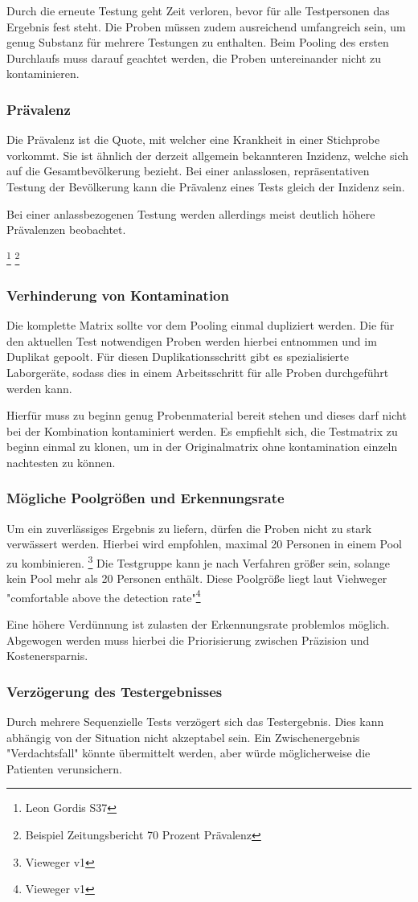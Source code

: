 Durch die erneute Testung geht Zeit verloren, bevor für alle Testpersonen das Ergebnis fest steht.
Die Proben müssen zudem ausreichend umfangreich sein, um genug Substanz für mehrere Testungen zu enthalten.
Beim Pooling des ersten Durchlaufs muss darauf geachtet werden, die Proben untereinander nicht zu kontaminieren.

\subsubsection{Prävalenz}
Die Prävalenz ist die Quote, mit welcher eine Krankheit in einer Stichprobe vorkommt.
Sie ist ähnlich der derzeit allgemein bekannteren Inzidenz, welche sich auf die Gesamtbevölkerung bezieht.
Bei einer anlasslosen, repräsentativen Testung der Bevölkerung kann die Prävalenz eines Tests gleich der Inzidenz sein.

Bei einer anlassbezogenen Testung werden allerdings meist deutlich höhere Prävalenzen beobachtet.

\footnote{Leon Gordis S37}
\footnote{Beispiel Zeitungsbericht 70 Prozent Prävalenz}


\subsubsection{Verhinderung von Kontamination}
Die komplette Matrix sollte vor dem Pooling einmal dupliziert werden. 
Die für den aktuellen Test notwendigen Proben werden hierbei entnommen und im Duplikat gepoolt.
Für diesen Duplikationsschritt gibt es spezialisierte Laborgeräte, sodass dies in einem Arbeitsschritt für alle Proben durchgeführt werden kann.

Hierfür muss zu beginn genug Probenmaterial bereit stehen und dieses darf nicht bei der Kombination kontaminiert werden.
Es empfiehlt sich, die Testmatrix zu beginn einmal zu klonen, um in der Originalmatrix ohne kontamination einzeln nachtesten zu können.

\subsubsection{Mögliche Poolgrößen und Erkennungsrate}
Um ein zuverlässiges Ergebnis zu liefern, dürfen die Proben nicht zu stark verwässert werden.
Hierbei wird empfohlen, maximal 20 Personen in einem Pool zu kombinieren. \footnote{Vieweger v1}
Die Testgruppe kann je nach Verfahren größer sein, solange kein Pool mehr als 20 Personen enthält.
Diese Poolgröße liegt laut Viehweger "comfortable above the detection rate"\footnote{Vieweger v1}

Eine höhere Verdünnung ist zulasten der Erkennungsrate problemlos möglich.
Abgewogen werden muss hierbei die Priorisierung zwischen Präzision und Kostenersparnis.

\subsubsection{Verzögerung des Testergebnisses}
Durch mehrere Sequenzielle Tests verzögert sich das Testergebnis.
Dies kann abhängig von der Situation nicht akzeptabel sein.
Ein Zwischenergebnis "Verdachtsfall" könnte übermittelt werden, aber würde möglicherweise die Patienten verunsichern.

